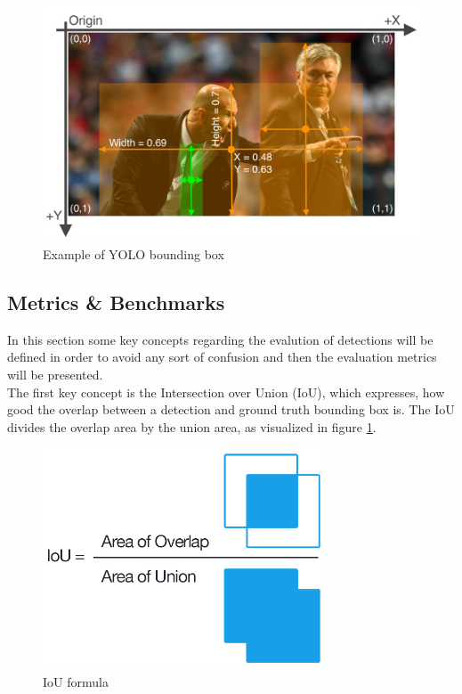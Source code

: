 \begin{figure}[h]
  \includegraphics[width=\textwidth]{images/yolo_labels_zidane}
  \centering
  \caption{Example of YOLO bounding box \cite{yolov5_train_custom}}
\end{figure}



\subsection{Metrics \& Benchmarks}
In this section some key concepts regarding the evalution of detections will be defined in order to avoid any sort of confusion and then the evaluation metrics will be presented. \\
The first key concept is the Intersection over Union (IoU), which expresses, how good the overlap between a detection and ground truth bounding box is. The IoU divides the overlap area by the union area, as visualized in figure \ref{fig:iou}.

\begin{figure}[h!]

  \includegraphics[width=0.75\textwidth]{images/iou}
  \centering
  \caption{IoU formula \cite{map_tutorial}}
  \label{fig:iou}
\end{figure}

